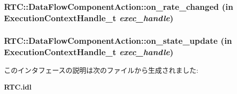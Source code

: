 \subsubsection[{on\_\-rate\_\-changed}]{ RTC::DataFlowComponentAction::on\_\-rate\_\-changed (in {\bf ExecutionContextHandle\_\-t} {\em exec\_\-handle})}\label{interfaceRTC_1_1DataFlowComponentAction_a6d010e52880cb1e4228817041a6ac518}
\subsubsection[{on\_\-state\_\-update}]{ RTC::DataFlowComponentAction::on\_\-state\_\-update (in {\bf ExecutionContextHandle\_\-t} {\em exec\_\-handle})}\label{interfaceRTC_1_1DataFlowComponentAction_a10aed288388578b108c9766f67997668}


このインタフェースの説明は次のファイルから生成されました:\begin{DoxyCompactItemize}
\item 
{\bf RTC.idl}\end{DoxyCompactItemize}
